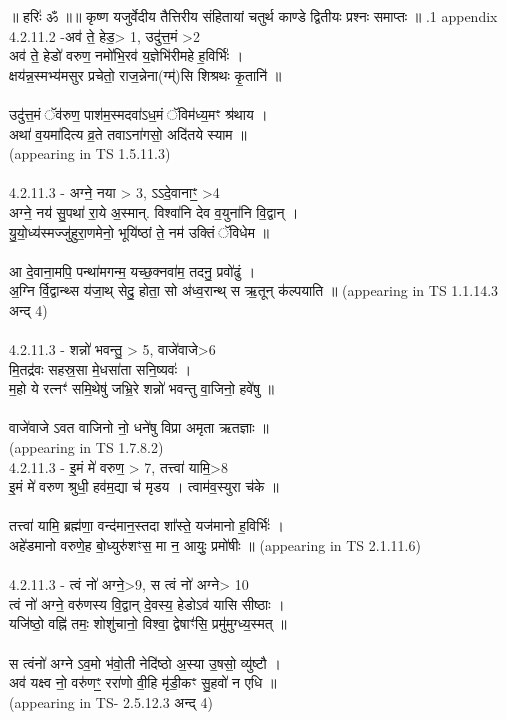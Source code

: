 \documentclass[17pt]{extarticle}
\begin{document}
॥ हरिः॑ ॐ ॥॥ कृष्ण यजुर्वेदीय तैत्तिरीय संहितायां चतुर्थ काण्डे द्वितीयः प्रश्नः समाप्तः ॥ \newline
{}.1   appendix\\4.2.11.2 -अव॑ ते॒ हेड॒> 1, उदु॑त्त॒मं >2 \\अव॑ ते॒ हेडो॑ वरुण॒ नमो॑भि॒रव॑ य॒ज्ञेभि॑रीमहे ह॒विर्भिः॑ । \\क्षय॑न्न॒स्मभ्य॑मसुर प्रचेतो॒ राज॒न्नेना(ग्म्॑)सि शिश्रथः कृ॒तानि॑ ॥ \\\\उदु॑त्त॒मं ॅव॑रुण॒ पाश॑म॒स्मदवा॑ऽध॒मं ॅविम॑ध्य॒मꣳ श्र॑थाय । \\अथा॑ व॒यमा॑दित्य व्र॒ते तवाऽना॑गसो॒ अदि॑तये स्याम ॥\\(appearing in TS 1.5.11.3)\\\\4.2.11.3 - अग्ने॒ नया > 3, ऽऽदे॒वानाꣳ॒॒ >4\\अग्ने॒ नय॑ सु॒पथा॑ रा॒ये अ॒स्मान्. विश्वा॑नि देव व॒युना॑नि वि॒द्वान् । \\यु॒यो॒ध्य॑स्मज्जु॑हुरा॒णमेनो॒ भूयि॑ष्ठां ते॒ नम॑ उक्तिं ॅविधेम ॥\\\\आ दे॒वाना॒मपि॒ पन्था॑मगन्म॒ यच्छ॒क्नवा॑म॒ तदनु॒ प्रवो॑ढुं । \\अ॒ग्नि र्वि॒द्वान्थ्स य॑जा॒थ् सेदु॒ होता॒ सो अ॑ध्व॒रान्थ् स ऋ॒तून् क॑ल्पयाति ॥ (appearing in TS 1.1.14.3 अन्द् 4)\\\\4.2.11.3 - शन्नो॑ भवन्तु॒ > 5, वाजे॑वाजे>6 \\मि॒तद्र॑वः सहस्र॒सा मे॒धसा॑ता सनि॒ष्यवः॑ । \\म॒हो ये रत्नꣳ॑ समि॒थेषु॑ जभ्रि॒रे शन्नो॑ भवन्तु वा॒जिनो॒ हवे॑षु ॥\\\\वाजे॑वाजे ऽवत वाजिनो नो॒ धने॑षु विप्रा अमृता ऋतज्ञाः ॥\\(appearing in TS 1.7.8.2)\\4.2.11.3 - इ॒मं मे॑ वरुण॒ > 7, तत्त्वा॑ यामि॒>8\\इ॒मं मे॑ वरुण श्रुधी॒ हव॑म॒द्या च॑ मृडय । त्वाम॑व॒स्युरा च॑के ॥ \\\\तत्त्वा॑ यामि॒ ब्रह्म॑णा॒ वन्द॑मान॒स्तदा शा᳚स्ते॒ यज॑मानो ह॒विर्भिः॑ । \\अहे॑डमानो वरुणे॒ह बो॒ध्युरु॑शꣳस॒ मा न॒ आयुः॒ प्रमो॑षीः ॥ (appearing in TS 2.1.11.6)\\\\4.2.11.3 - त्वं नो॑ अग्ने॒>9, स त्वं नो॑ अग्ने> 10 \\त्वं नो॑ अग्ने॒ वरु॑णस्य वि॒द्वान् दे॒वस्य॒ हेडोऽव॑ यासि सीष्ठाः । \\यजि॑ष्ठो॒ वह्नि॑ तमः॒ शोशु॑चानो॒ विश्वा॒ द्वेषाꣳ॑सि॒ प्रमु॑मुग्ध्य॒स्मत् ॥ \\\\स त्वंनो॑ अग्ने ऽव॒मो भ॑वो॒ती नेदि॑ष्ठो अ॒स्या उ॒षसो॒ व्यु॑ष्टौ । \\अव॑ यक्ष्व नो॒ वरु॑णꣳ॒॒ ररा॑णो वी॒हि मृ॑डी॒कꣳ सु॒हवो॑ न एधि ॥\\(appearing in TS- 2.5.12.3 अन्द् 4)\\
\pagebreak
        
\end{document}
